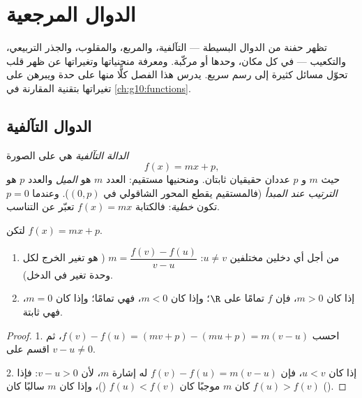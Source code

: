 \chapter{الدوال المرجعية}\label{ch:g10:reffunc}

تظهر حفنة من الدوال البسيطة --- التآلفية، والمربع، والمقلوب، والجذر
التربيعي، والتكعيب --- في كل مكان، وحدها أو مركّبة. ومعرفة منحنياتها
وتغيراتها عن ظهر قلب تحوّل مسائل كثيرة إلى رسم سريع. يدرس هذا الفصل
كلًّا منها على حدة ويبرهن على تغيراتها بتقنية المقارنة في \cref{ch:g10:functions}.

\section{الدوال التآلفية}

\begin{definition}\label{def:g10:reffunc:affine}
\emph{الدالة التآلفية} هي  على الصورة
\[
f(x) = mx + p,
\]
حيث $m$ و $p$ عددان حقيقيان ثابتان. ومنحنيها مستقيم:
العدد $m$ هو \emph{الميل} والعدد $p$ هو
\emph{الترتيب عند المبدأ} (فالمستقيم يقطع
المحور الشاقولي في $(0, p)$). وعندما $p = 0$ تكون 
\emph{خطية}: فالكتابة $f(x) = mx$ تعبّر عن التناسب.
\end{definition}

\begin{proposition}\label{prop:g10:reffunc:affine}
لتكن $f(x) = mx + p$.
\begin{enumerate}
  \item من أجل أي دخلين مختلفين $u \neq v$:
        $m = \dfrac{f(v) - f(u)}{v - u}$ ( هو تغير
        الخرج لكل وحدة تغير في الدخل).
  \item إذا كان $m > 0$، فإن $f$  تمامًا على $\R$؛ وإذا كان $m < 0$،
        فهي  تمامًا؛ وإذا كان $m = 0$، فهي ثابتة.
\end{enumerate}
\end{proposition}

\begin{proof}
1. احسب $f(v) - f(u) = (mv + p) - (mu + p) = m(v - u)$، ثم اقسم على
$v - u \neq 0$.

2. إذا كان $u < v$، فإن $f(v) - f(u) = m(v-u)$ له إشارة $m$، لأن
$v - u > 0$: فإذا كان $m$ موجبًا كان $f(u) < f(v)$ ()، وإذا كان $m$ سالبًا
كان $f(u) > f(v)$ ().
\end{proof}

